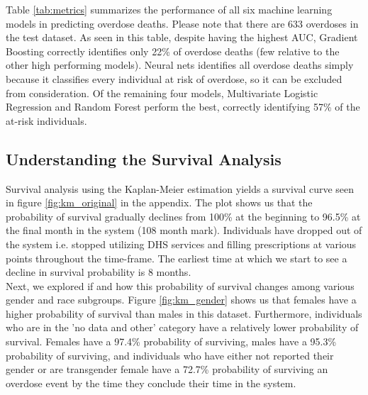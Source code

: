 \documentclass[twoside,10.5pt]{article}
\begin{document}
Table \ref{tab:metrics} summarizes the performance of all six machine learning models in predicting overdose deaths. Please note that there are 633 overdoses in the test dataset. As seen in this table, despite having the highest AUC, Gradient Boosting correctly identifies only 22\% of overdose deaths (few relative to the other high performing models). Neural nets identifies all overdose deaths simply because it classifies every individual at risk of overdose, so it can be excluded from consideration. Of the remaining four models, Multivariate Logistic Regression and Random Forest perform the best, correctly identifying 57\% of the at-risk individuals. 

\subsection{Understanding the Survival Analysis}
Survival analysis using the Kaplan-Meier estimation yields a survival curve seen in figure \ref{fig:km_original} in the appendix. The plot shows us that the probability of survival gradually declines from 100\% at the beginning to 96.5\% at the final month in the system (108 month mark). Individuals have dropped out of the system i.e. stopped utilizing DHS services and filling prescriptions at various points throughout the time-frame. The earliest time at which we start to see a decline in survival probability is 8 months.\\

Next, we explored if and how this probability of survival changes among various gender and race subgroups. Figure \ref{fig:km_gender} shows us that females have a higher probability of survival than males in this dataset. Furthermore, individuals who are in the 'no data and other' category have a relatively lower probability of survival. Females have a 97.4\% probability of surviving, males have a 95.3\% probability of surviving, and individuals who have either not reported their gender or are transgender female have a 72.7\% probability of surviving an overdose event by the time they conclude their time in the system. \\
\end{document}
